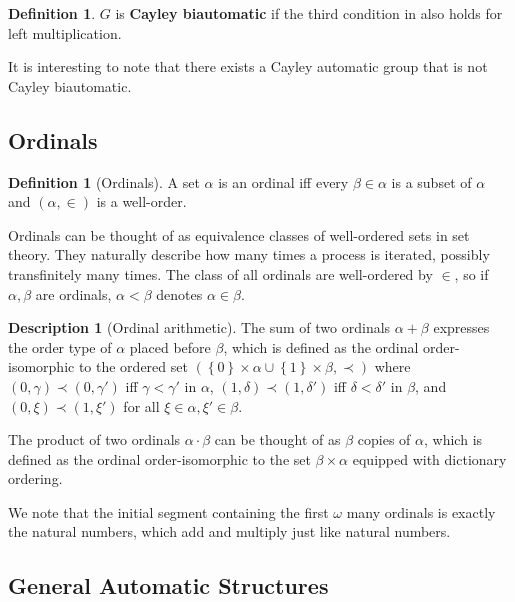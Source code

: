 \documentclass[british,a4paper,]{scrartcl}
\theoremstyle{definition}
\newtheorem{definition}[theorem]{Definition}
\newtheorem{descr}[theorem]{Description}
\theoremstyle{remark}
\newcommand{\set}[1]{\left\{ #1 \right\}}
\begin{document}
\begin{definition} \label{defn:cayleybiauto}
    \(G\) is \textbf{Cayley biautomatic} if
    the third condition in  also holds for left multiplication.
\end{definition}

It is interesting to note that there exists a Cayley automatic group that is not Cayley biautomatic.
\autocite{MS}

\subsection{Ordinals}

\begin{definition}[Ordinals]
    A set \(\alpha\) is an ordinal iff every \(\beta\in\alpha\) is a subset of \(\alpha\) and
    \((\alpha, \in)\) is a well-order.
\end{definition}
Ordinals can be thought of as equivalence classes of well-ordered sets in set theory.
They naturally describe how many times a process is iterated, possibly transfinitely many times.
The class of all ordinals are well-ordered by \(\in\), so if \(\alpha, \beta\) are ordinals, \(\alpha < \beta\) denotes \(\alpha \in \beta\).

\begin{descr}[Ordinal arithmetic]
    The sum of two ordinals \(\alpha + \beta\)
    expresses the order type of \(\alpha\) placed before \(\beta\),
    which is defined as the ordinal order-isomorphic to
    the ordered set \((\set{0}\times \alpha \cup \set{1}\times \beta, \prec)\)
    where \((0,\gamma) \prec (0,\gamma')\) iff \(\gamma < \gamma'\) in \(\alpha\),
    \((1,\delta) \prec (1,\delta')\) iff \(\delta < \delta'\) in \(\beta\), and
    \((0,\xi) \prec (1,\xi')\) for all \(\xi\in\alpha, \xi'\in\beta\).

    The product of two ordinals \(\alpha\cdot \beta\) can be thought of as
    \(\beta\) copies of \(\alpha\), which is defined as the ordinal order-isomorphic to the set \(\beta\times \alpha\) equipped with dictionary ordering.

    We note that the initial segment containing the first \(\omega\) many ordinals is exactly the natural numbers, which add and multiply just like natural numbers.
\end{descr}

\subsection{General Automatic Structures}
\end{document}
